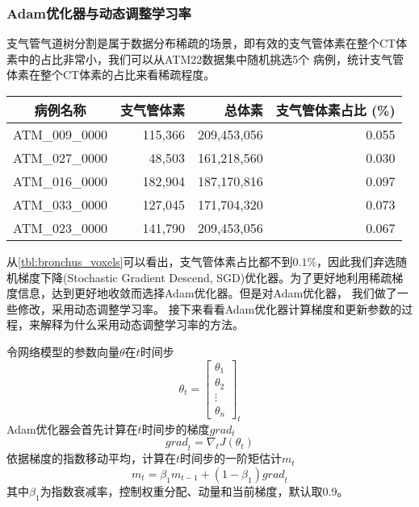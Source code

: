 \subsubsection{Adam优化器与动态调整学习率}
支气管气道树分割是属于数据分布稀疏的场景，即有效的支气管体素在整个CT体素中的占比非常小，我们可以从ATM22数据集中随机挑选5个
病例，统计支气管体素在整个CT体素的占比来看稀疏程度。
\begin{table}[!htp]
    \label{tbl:bronchus_voxels}
    \centering
    \begin{tabular}{crrr}
        \toprule
        病例名称 & 支气管体素 & 总体素 & 支气管体素占比 (\%)\\
        \midrule
        ATM\_009\_0000 &	 115,366 &	 209,453,056 &	 0.055 \\
        ATM\_027\_0000 &	 48,503  &	 161,218,560 &	 0.030 \\
        ATM\_016\_0000 &	 182,904 &	 187,170,816 &	 0.097 \\
        ATM\_033\_0000 &	 127,045 &	 171,704,320 &	 0.073 \\
        ATM\_023\_0000 &	 141,790 &	 209,453,056 &	 0.067 \\
        \bottomrule
    \end{tabular}
\end{table}
从\autoref{tbl:bronchus_voxels}可以看出，支气管体素占比都不到$0.1\%$，因此我们弃选随机梯度下降(Stochastic Gradient
Descend, SGD)优化器。为了更好地利用稀疏梯度信息，达到更好地收敛而选择Adam优化器\cite{Kingma2014AdamAM}。但是对Adam优化器，
我们做了一些修改，采用动态调整学习率。
接下来看看Adam优化器计算梯度和更新参数的过程，来解释为什么采用动态调整学习率的方法。

令网络模型的参数向量$\theta$在$t$时间步
\begin{equation}
\theta_{t} = \begin{bmatrix}
    \theta_{1} \\
    \theta_{2} \\
    \vdots      \\
    \theta_{n}
\end{bmatrix}_{t}
\end{equation}
Adam优化器会首先计算在$t$时间步的梯度$grad_{t}$
\begin{equation}
    {grad}_{t} = \nabla_{t}J(\theta_{t})
\end{equation}
依据梯度的指数移动平均，计算在$t$时间步的一阶矩估计$m_{t}$
\begin{equation}
    m_{t} = \beta_{1} m_{t-1} + (1 - \beta_{1}) {grad}_{t}
\end{equation}
其中$\beta_{1}$为指数衰减率，控制权重分配、动量和当前梯度，默认取0.9。

